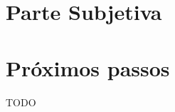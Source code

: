 \chapter*{Parte Subjetiva}
\label{sec:parte_subjetiva}

\newcommand\materia[3]{\noindent \textbf{#1} - \texttt{#2}\\\indent #3\vspace{0.5cm}\\}





\chapter{Próximos passos}
\label{sec:proximos_passos}

TODO
